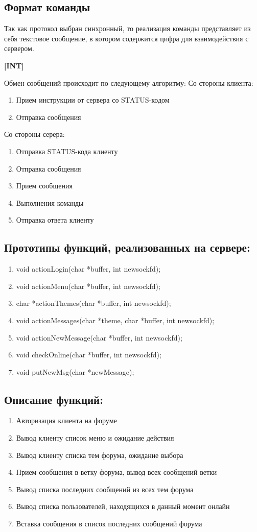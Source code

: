 \documentclass[a4paper,12pt]{extarticle}
\begin{document}
\subsection{Формат команды}
Так как протокол выбран синхронный, то реализация команды представляет из себя текстовое сообщение, в котором содержится цифра для взаимодействия с сервером.
\begin{center}\large\textbf{[INT]}\end{center}
Обмен сообщений происходит по следующему алгоритму:
\newline
Со стороны клиента:
\begin{enumerate}
\item Прием инструкции от сервера со STATUS-кодом
\item Отправка сообщения
\end{enumerate}
Со стороны серера:
\begin{enumerate}
\item Отправка STATUS-кода клиенту
\item Отправка сообщения
\item Прием сообщения
\item Выполнения команды
\item Отправка ответа клиенту
\end{enumerate}
\subsection{Прототипы функций, реализованных на сервере:}
\begin{enumerate}
\item void actionLogin(char *buffer, int newsockfd);
\item void actionMenu(char *buffer, int newsockfd);
\item char *actionThemes(char *buffer, int newsockfd);
\item void actionMessages(char *theme, char *buffer, int newsockfd);
\item void actionNewMessage(char *buffer, int newsockfd);
\item void checkOnline(char *buffer, int newsockfd);
\item void putNewMsg(char *newMessage);
\end{enumerate}

\subsection{Описание функций:}
\begin{enumerate}
\item Авторизация клиента на форуме
\item Вывод клиенту список меню и ожидание действия
\item Вывод клиенту списка тем форума, ожидание выбора
\item Прием сообщения в ветку форума, вывод всех сообщений ветки
\item Вывод списка последних сообщений из всех тем форума
\item Вывод списка пользователей, находящихся в данный момент онлайн
\item Вставка сообщения в список последних сообщений форума
\end{enumerate}
\end{document}
